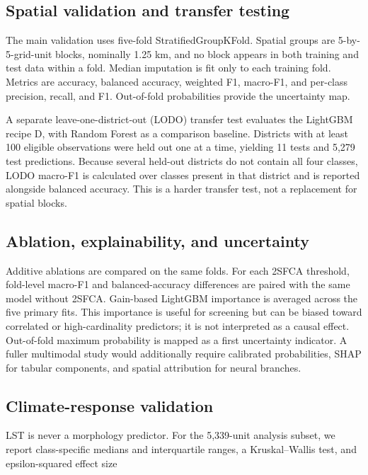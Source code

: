 \subsection{Spatial validation and transfer testing}

The main validation uses five-fold StratifiedGroupKFold. Spatial groups are
5-by-5-grid-unit blocks, nominally 1.25 km, and no block appears in both training and
test data within a fold. Median imputation is fit only to each training fold.
Metrics are accuracy, balanced accuracy, weighted F1, macro-F1, and per-class
precision, recall, and F1. Out-of-fold probabilities provide the uncertainty
map.

A separate leave-one-district-out (LODO) transfer test evaluates the LightGBM recipe
D, with Random Forest as a comparison baseline. Districts with at least 100
eligible observations were held out one at a time, yielding 11 tests and 5,279
test predictions. Because several held-out
districts do not contain all four classes, LODO macro-F1 is calculated over
classes present in that district and is reported alongside balanced accuracy.
This is a harder transfer test, not a replacement for spatial blocks.

\subsection{Ablation, explainability, and uncertainty}

Additive ablations are compared on the same folds. For each 2SFCA threshold,
fold-level macro-F1 and balanced-accuracy differences are paired with the same
model without 2SFCA. Gain-based LightGBM importance is averaged across the five
primary fits. This importance is useful for screening but can be biased toward
correlated or high-cardinality predictors; it is not interpreted as a causal
effect. Out-of-fold maximum probability is mapped as a first uncertainty
indicator. A fuller multimodal study would additionally require calibrated
probabilities, SHAP for tabular components, and spatial attribution for neural
branches.

\subsection{Climate-response validation}

LST is never a morphology predictor. For the 5,339-unit analysis subset, we
report class-specific medians and interquartile ranges, a Kruskal--Wallis test,
and epsilon-squared effect size

